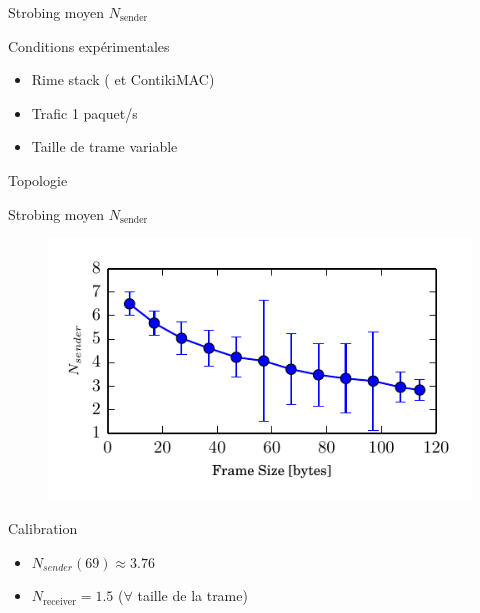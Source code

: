 \begin{frame}{Strobing moyen $N_{\textrm{sender}}$}
  \begin{block}{Conditions expérimentales}
    \begin{itemize}
      \item Rime stack (\ieee{} et ContikiMAC)
      \item Trafic 1 paquet/s
      \item Taille de trame variable
    \end{itemize}
  \end{block}
  \begin{block}{Topologie}
    \begin{figure}
      \centering
      
    \end{figure}
  \end{block}
\end{frame}

\begin{frame}{Strobing moyen $N_{\textrm{sender}}$}
  \begin{figure}
    \includegraphics[width=.8\textwidth]{figures/average_strobbing.pdf}
  \end{figure}
  \begin{block}{Calibration}
    \begin{itemize}
      \item $N_{sender}(69) \approx 3.76$
      \item $N_{\textrm{receiver}} = 1.5$ ($\forall$ taille de la trame)
    \end{itemize}
  \end{block}
\end{frame}

